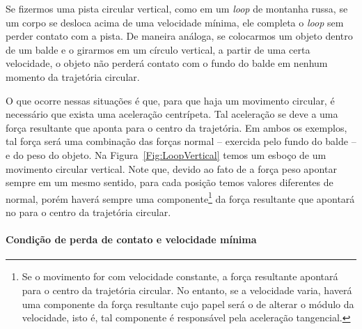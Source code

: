 Se fizermos uma pista circular vertical, como em um \emph{loop} de montanha russa, se um corpo se desloca acima de uma velocidade mínima, ele completa o \emph{loop} sem perder contato com a pista. De maneira análoga, se colocarmos um objeto dentro de um balde e o girarmos em um círculo vertical, a partir de uma certa velocidade, o objeto não perderá contato com o fundo do balde em nenhum momento da trajetória circular.

O que ocorre nessas situações é que, para que haja um movimento circular, é necessário que exista uma aceleração centrípeta. Tal aceleração se deve a uma força resultante que aponta para o centro da trajetória. Em ambos os exemplos, tal força será uma combinação das forças normal -- exercida pelo fundo do balde -- e do peso do objeto. Na Figura~\ref{Fig:LoopVertical} temos um esboço de um movimento circular vertical. Note que, devido ao fato de a força peso apontar sempre em um mesmo sentido, para cada posição temos valores diferentes de normal, porém haverá sempre uma componente\footnote{Se o movimento for com velocidade constante, a força resultante apontará para o centro da trajetória circular. No entanto, se a velocidade varia, haverá uma componente da força resultante cujo papel será o de alterar o módulo da velocidade, isto é, tal componente é responsável pela aceleração tangencial.} da força resultante que apontará no para o centro da trajetória circular.

\paragraph{Condição de perda de contato e velocidade mínima}

